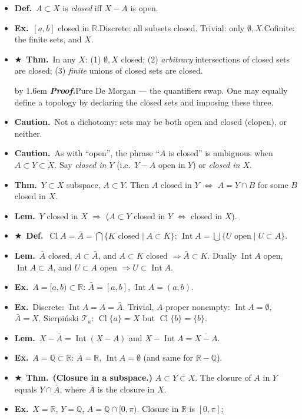 \documentclass[12pt,a4paper]{article}
\newcommand{\Dfn}{\textbf{Def.}~}
\newcommand{\Thm}{\textbf{Thm.}~}
\newcommand{\Lem}{\textbf{Lem.}~}
\newcommand{\Exa}{\textbf{Ex.}~}
\newcommand{\Warn}{\textbf{Caution.}~}
\newcommand{\Key}{$\bigstar$~}                  %
\newcommand{\Pf}[1]{%
  \par\addvspace{7pt}\nopagebreak
  \begingroup
    \advance\leftskip by 1.6em
    \parindent=0pt \small\color{prf}%
    \textbf{\textit{Proof.}}\enspace #1\par
  \endgroup
  \addvspace{9pt}}
\newenvironment{BL}%
  {\begin{itemize}[leftmargin=1.4em,labelsep=0.55em,itemsep=11pt,topsep=11pt,parsep=0pt]}%
  {\end{itemize}}
\newcommand{\RR}{\mathbb{R}}
\newcommand{\QQ}{\mathbb{Q}}
\newcommand{\cT}{\mathcal{T}}
\DeclareMathOperator{\Cl}{Cl}
\DeclareMathOperator{\Int}{Int}
\renewcommand{\iff}{\Leftrightarrow}
\newcommand{\imp}{\Rightarrow}
\begin{document}
\begin{BL}
\item \Dfn $A\subset X$ is \emph{closed} iff $X-A$ is open.
\item \Exa $[a,b]$ closed in $\RR$.\quad Discrete: all subsets closed.\quad
      Trivial: only $\emptyset,X$.\quad Cofinite: the finite sets, and $X$.
\item \Key\Thm In any $X$: (1) $\emptyset,X$ closed; (2) \emph{arbitrary} intersections of
      closed sets are closed; (3) \emph{finite} unions of closed sets are closed.
\Pf{Pure De Morgan --- the quantifiers swap. One may equally define a topology by declaring
the closed sets and imposing these three.}
\item \Warn Not a dichotomy: sets may be both open and closed (clopen), or neither.
\item \Warn As with ``open'', the phrase ``$A$ is closed'' is ambiguous when
      $A\subset Y\subset X$. Say \emph{closed in $Y$} (i.e.\ $Y-A$ open in $Y$) or
      \emph{closed in $X$}.
\item \Thm $Y\subset X$ subspace, $A\subset Y$. Then $A$ closed in $Y$
      $\iff$ $A=Y\cap B$ for some $B$ closed in $X$.
\item \Lem $Y$ closed in $X$ $\imp$ ($A\subset Y$ closed in $Y$ $\iff$ closed in $X$).
\item \Key\Dfn $\Cl A=\bar A=\bigcap\{K\text{ closed}\mid A\subset K\}$;\quad
      $\Int A=\bigcup\{U\text{ open}\mid U\subset A\}$.
\item \Lem $\bar A$ closed, $A\subset\bar A$, and $A\subset K$ closed $\imp\bar A\subset K$.
      Dually $\Int A$ open, $\Int A\subset A$, and $U\subset A$ open $\imp U\subset\Int A$.
\item \Exa $A=[a,b)\subset\RR$: $\bar A=[a,b]$, $\Int A=(a,b)$.
\item \Exa Discrete: $\Int A=A=\bar A$. Trivial, $A$ proper nonempty: $\Int A=\emptyset$, $\bar A=X$.
      Sierpi\'nski $\cT_a$: $\Cl\{a\}=X$ but $\Cl\{b\}=\{b\}$.
\item \Lem $X-\bar A=\Int(X-A)$ \quad and \quad $X-\Int A=\overline{X-A}$.
\item \Exa $A=\QQ\subset\RR$: $\bar A=\RR$, $\Int A=\emptyset$ (and same for $\RR-\QQ$).
\item \Key\Thm \textbf{(Closure in a subspace.)} $A\subset Y\subset X$. The closure of $A$
      in $Y$ equals $Y\cap\bar A$, where $\bar A$ is the closure in $X$.
\item \Exa $X=\RR$, $Y=\QQ$, $A=\QQ\cap[0,\pi)$. Closure in $\RR$ is $[0,\pi]$;

\end{BL}
\end{document}
